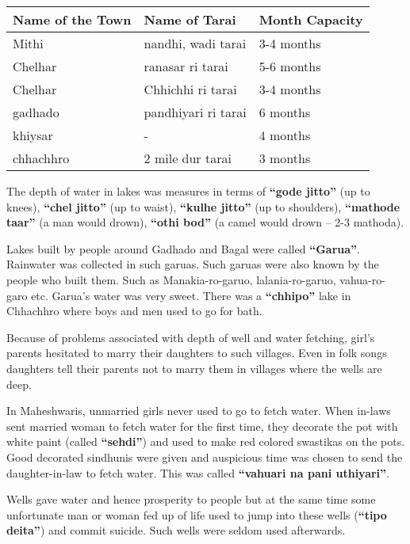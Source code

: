 \begin{center}
\begin{tabular}{l|l|l}
\hline
\textbf{Name of the Town} & \textbf{Name of Tarai} & \textbf{Month Capacity} \\
\hline
Mithi & nandhi, wadi tarai & 3-4 months \\ 
Chelhar & ranasar ri tarai & 5-6 months \\ 
Chelhar & Chhichhi ri tarai & 3-4 months \\ 
gadhado & pandhiyari ri tarai & 6 months \\ 
khiysar & - & 4 months \\ 
chhachhro & 2 mile dur tarai & 3 months \\ 
\hline
\end{tabular}
\end{center}

The depth of water in lakes was measures in terms of \textbf{``gode jitto''}
(up to knees), \textbf{``chel jitto''} (up to waist), \textbf{``kulhe jitto''}
(up to shoulders), \textbf{``mathode taar''} (a man would drown), \textbf{``othi
bod''} (a camel would drown -- 2-3 mathoda).

Lakes built by people around Gadhado and Bagal were called \textbf{``Garua''}.
Rainwater was collected in such garuas. Such garuas were also known by the
people who built them. Such as Manakia-ro-garuo, lalania-ro-garuo, vahua-ro-garo
etc. Garua's water was very sweet. There was a \textbf{``chhipo''} lake in
Chhachhro where boys and men used to go for bath.

Because of problems associated with depth of well and water fetching, girl's
parents hesitated to marry their daughters to such villages. Even in folk songs
daughters tell their parents not to marry them in villages where the wells are
deep.

In Maheshwaris, unmarried girls never used to go to fetch water. When in-laws
sent married woman to fetch water for the first time, they decorate the pot
with white paint (called \textbf{``sehdi''}) and used to make red colored
swastikas on the pots. Good decorated sindhunis were given and auspicious time
was chosen to send the daughter-in-law to fetch water. This was called
\textbf{``vahuari na pani uthiyari''}.

Wells gave water and hence prosperity to people but at the same time some
unfortunate man or woman fed up of life used to jump into these wells
(\textbf{``tipo deita''}) and commit suicide. Such wells were seldom used
afterwards.

